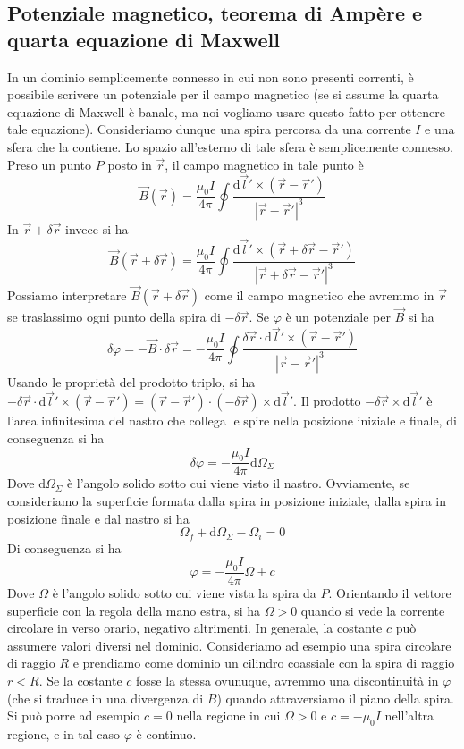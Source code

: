 \documentclass[a4paper,11pt]{book}
\newcommand{\dif}{\mathrm{d}}
\theoremstyle{definition}
\theoremstyle{theorem}
\begin{document}
\subsection{Potenziale magnetico, teorema di Ampère e quarta equazione di Maxwell}
In un dominio semplicemente connesso in cui non sono presenti correnti, è possibile scrivere un potenziale per il campo magnetico (se si assume la quarta equazione di Maxwell è banale, ma noi vogliamo usare questo fatto per ottenere tale equazione). Consideriamo dunque una spira percorsa da una corrente $I$ e una sfera che la contiene. Lo spazio all'esterno di tale sfera è semplicemente connesso. Preso un punto $P$ posto in $\vec{r}$, il campo magnetico in tale punto è
\[\vec{B}(\vec{r})=\frac{\mu_0I}{4\pi}\oint\frac{\dif\vec{l}'\times(\vec{r}-\vec{r}')}{|\vec{r}-\vec{r}'|^3}\]
In $\vec{r}+\delta\vec{r}$ invece si ha
\[\vec{B}(\vec{r}+\delta\vec{r})=\frac{\mu_0I}{4\pi}\oint\frac{\dif\vec{l}'\times(\vec{r}+\delta\vec{r}-\vec{r}')}{|\vec{r}+\delta\vec{r}-\vec{r}'|^3}\]
Possiamo interpretare $\vec{B}(\vec{r}+\delta\vec{r})$ come il campo magnetico che avremmo in $\vec{r}$ se traslassimo ogni punto della spira di $-\delta\vec{r}$. Se $\varphi$ è un potenziale per $\vec{B}$ si ha
\[\delta\varphi=-\vec{B}\cdot\delta\vec{r}=-\frac{\mu_0I}{4\pi}\oint\frac{\delta\vec{r}\cdot\dif\vec{l}'\times(\vec{r}-\vec{r}')}{|\vec{r}-\vec{r}'|^3}\]
Usando le proprietà del prodotto triplo, si ha $-\delta\vec{r}\cdot\dif\vec{l}'\times(\vec{r}-\vec{r}')=(\vec{r}-\vec{r}')\cdot(-\delta\vec{r})\times\dif\vec{l}'$.
Il prodotto $-\delta\vec{r}\times\dif\vec{l}'$ è l'area infinitesima del nastro che collega le spire nella posizione iniziale e finale, di conseguenza si ha
\[\delta\varphi=-\frac{\mu_0I}{4\pi}\dif\Omega_\Sigma\]
Dove $\dif\Omega_\Sigma$ è l'angolo solido sotto cui viene visto il nastro. Ovviamente, se consideriamo la superficie formata dalla spira in posizione iniziale, dalla spira in posizione finale e dal nastro si ha
\[\Omega_f+\dif\Omega_\Sigma-\Omega_i=0\]
Di conseguenza si ha
\[\varphi=-\frac{\mu_0I}{4\pi}\Omega+c\]
Dove $\Omega$ è l'angolo solido sotto cui viene vista la spira da $P$. Orientando il vettore superficie con la regola della mano estra, si ha $\Omega>0$ quando si vede la corrente circolare in verso orario, negativo altrimenti.
In generale, la costante $c$ può assumere valori diversi nel dominio. Consideriamo ad esempio una spira circolare di raggio $R$ e prendiamo come dominio un cilindro coassiale con la spira di raggio $r<R$. Se la costante $c$ fosse la stessa ovunuque, avremmo una discontinuità in $\varphi$ (che si traduce in una divergenza di $B$) quando attraversiamo il piano della spira. Si può porre ad esempio $c=0$ nella regione in cui $\Omega>0$ e $c=-\mu_0I$ nell'altra regione, e in tal caso $\varphi$ è continuo.
\end{document}
